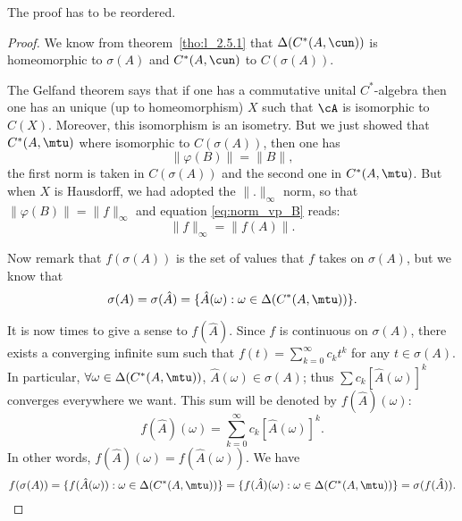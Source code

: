 \begin{probleme}
    The proof has to be reordered.
\end{probleme}

\begin{proof}
We know from theorem~\ref{tho:l_2.5.1} that $\Delta(C^*(A,\cun))$ is homeomorphic to $\sigma(A)$ and $C^*(A,\cun)$ to $C(\sigma(A))$.

The Gelfand theorem says that if one has a commutative unital $C^{*}$-algebra then  one has an unique (up to homeomorphism) $X$ such that $\cA$ is isomorphic to $C(X)$. Moreover, this isomorphism is an isometry. But we just showed that $C^*(A,\mtu)$ where isomorphic to $C(\sigma(A))$, then one has
\begin{equation}\label{eq:norm_vp_B}
  \|\varphi(B)\|=\|B\|,
\end{equation}
the first norm is taken in $C(\sigma(A))$ and the second one in $C^*(A,\mtu)$. But when $X$ is Hausdorff, we had adopted the $\|.\|_{\infty}$ norm, so that $\|\varphi(B)\|=\|f\|_{\infty}$ and equation \eqref{eq:norm_vp_B} reads:
\begin{equation}
\|f\|_{\infty}=\|f(A)\|.
\end{equation}

Now remark that $f(\sigma(A))$ is the set of values that $f$ takes on $\sigma(A)$, but we know that
\[
\sigma(A)=\sigma(\hat A)=\{ \hat A(\omega):\omega\in\Delta(C^*(A,\mtu)) \}.
\]

It is now times to give a sense to $f(\hat{A})$.  Since $f$ is continuous on $\sigma(A)$, there exists a converging infinite sum such that $f(t)=\sum_{k=0}^{\infty}c_kt^k$ for any $t\in\sigma(A)$. In particular, $\forall\omega\in\Delta(C^*(A,\mtu))$, $\hat A(\omega)\in\sigma(A)$; thus
   $\sum c_k[\hat A(\omega)]^k$ converges everywhere we want. This sum will be denoted by $f(\hat{A})(\omega)$:
\begin{equation}
f(\hat A)(\omega)=\sum_{k=0}^{\infty}c_k[\hat A(\omega)]^k.
\end{equation}
In other words, $f(\hat A)(\omega)=f(\hat A(\omega))$. We have
\begin{equation}
   f(\sigma(A))=\{f(\hat A(\omega)):\omega\in\Delta( C^*(A,\mtu) )\}
               =\{ f(\hat A)(\omega):\omega\in\Delta( C^*(A,\mtu) ) \}
           =\sigma(f(\hat A)).
\end{equation}



\end{proof}
